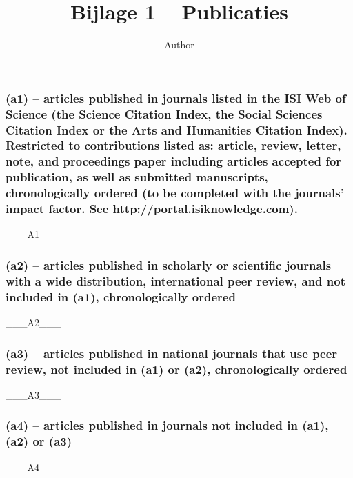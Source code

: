 \documentclass[a4paper,10pt]{article}
\author{Author}
\title{Bijlage 1 -- Publicaties}
\begin{document}
\pagestyle{empty}

%
%
%



\maketitle


\subsubsection*{(a1) -- articles published in journals listed in the ISI Web of Science (the Science Citation Index, the Social Sciences Citation Index or the Arts and Humanities Citation Index). Restricted to contributions listed as: article, review, letter, note, and {\bf proceedings paper} including articles accepted for publication, as well as submitted manuscripts, chronologically ordered (to be completed with the journals' impact factor. See http://portal.isiknowledge.com).}
{___A1___}

\subsubsection*{(a2) -- articles published in scholarly or scientific journals with a wide distribution, international peer review, and not included in (a1), chronologically ordered}
{___A2___}

\subsubsection*{(a3) -- articles published in national journals that use peer review, not included in (a1) or (a2), chronologically ordered}
{___A3___}

\subsubsection*{(a4) -- articles published in journals not included in (a1), (a2) or (a3)}
{___A4___}
\end{document}
